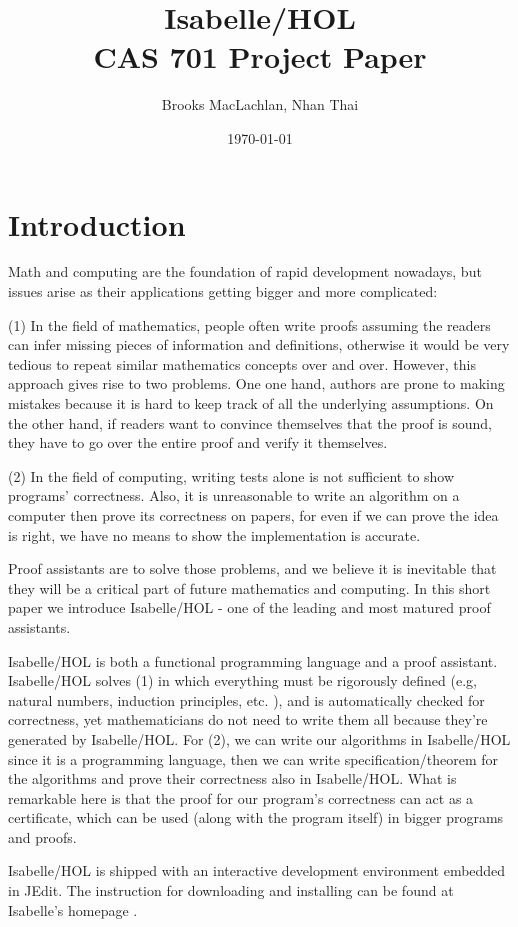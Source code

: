 \documentclass{article}
\title{Isabelle/HOL \\ \large CAS 701 Project Paper}
\author{Brooks MacLachlan, Nhan Thai}
\date{\today}
\begin{document}
	
\maketitle

\newpage
\section{Introduction}
Math and computing are the foundation of rapid development nowadays, but issues arise as their applications getting bigger and
more complicated:

(1) In the field of mathematics, people often write proofs assuming
the readers can infer missing pieces of information and definitions,
otherwise it would be very tedious to repeat similar mathematics concepts
over and over. However, this approach gives rise to two problems. One one hand,
authors are prone to making mistakes because it is hard to
keep track of all the underlying assumptions. On the other hand, if readers
want to convince themselves that the proof is sound, they have to go over the entire
proof and verify it themselves.

(2) In the field of computing, writing tests alone is not
sufficient to show programs' correctness.
Also, it is unreasonable to write an algorithm on a computer then prove its
correctness on papers, for even if we can prove the idea is right, we have
no means to show the implementation is accurate.


Proof assistants are to solve those problems,
and we believe it is inevitable that they will be a critical part of future mathematics and computing.
In this short paper we introduce Isabelle/HOL - one of the leading and most matured proof assistants.

Isabelle/HOL is both a functional programming language and a proof assistant.
Isabelle/HOL solves (1) in which everything must be rigorously defined (e.g, natural numbers, induction principles, etc. ),
and is automatically checked for correctness, yet mathematicians do not need to write them all
because they're generated by Isabelle/HOL. For (2), we can write our algorithms in Isabelle/HOL since
it is a programming language, then we can write specification/theorem for the algorithms and prove their
correctness also in Isabelle/HOL. What is remarkable here is that the proof for our program's correctness
can act as a certificate, which can be used (along with the program itself) in bigger programs and proofs.

Isabelle/HOL is shipped with an interactive development environment embedded in JEdit.
The instruction for downloading and installing can be found at Isabelle's homepage \cite{IsabelleWebsite}.
\end{document}
